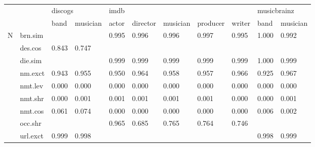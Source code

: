 \documentclass[epsfig,a4paper,11pt,titlepage,twoside,openany]{book}
\begin{document}
\begin{table}[H]
\centering
\begin{tabular}{ll|l|l|l|l|l|l|l|l|l|}
\cline{3-11}
                                                       &          & \multicolumn{2}{l|}{discogs} & \multicolumn{5}{l|}{imdb}                       & \multicolumn{2}{l|}{musicbrainz} \\ \cline{3-11} 
                                                       &          & band        & musician       & actor & director & musician & producer & writer & band          & musician         \\ \hline \hline
\multicolumn{1}{|l|}{\multirow{10}{*}{N}}       & brn.sim  &             &                & 0.995 & 0.996    & 0.996    & 0.997    & 0.995  & 1.000         & 0.992            \\ \cline{2-11} 
\multicolumn{1}{|l|}{}                                 & des.cos  & 0.843       & 0.747          &       &          &          &          &        &               &                  \\ \cline{2-11} 
\multicolumn{1}{|l|}{}                                 & die.sim  &             &                & 0.999 & 0.999    & 0.999    & 0.999    & 0.999  & 1.000         & 0.999            \\ \cline{2-11} 
\multicolumn{1}{|l|}{}                                 & nm.exct  & 0.943       & 0.955          & 0.950 & 0.964    & 0.958    & 0.957    & 0.966  & 0.925         & 0.967            \\ \cline{2-11} 
\multicolumn{1}{|l|}{}                                 & nmt.lev  & 0.000       & 0.000          & 0.000 & 0.000    & 0.000    & 0.000    & 0.000  & 0.000         & 0.000            \\ \cline{2-11} 
\multicolumn{1}{|l|}{}                                 & nmt.shr  & 0.000       & 0.001          & 0.001 & 0.001    & 0.001    & 0.001    & 0.000  & 0.000         & 0.001            \\ \cline{2-11} 
\multicolumn{1}{|l|}{}                                 & nmt.cos  & 0.061       & 0.074          & 0.000 & 0.000    & 0.000    & 0.000    & 0.000  & 0.006         & 0.002            \\ \cline{2-11} 
\multicolumn{1}{|l|}{}                                 & occ.shr  &             &                & 0.965 & 0.685    & 0.765    & 0.764    & 0.746  &               &                  \\ \cline{2-11} 
\multicolumn{1}{|l|}{}                                 & url.exct & 0.999       & 0.998          &       &          &          &          &        & 0.998         & 0.999            \\ \cline{2-11} 

\end{tabular}
\end{table}
\end{document}

